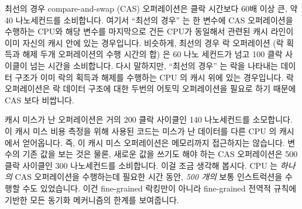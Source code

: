최선의 경우 compare-and-swap (CAS) 오퍼레이션은 클락 시간보다 60배 이상 큰, 약
40 나노세컨드를 소비합니다.
여기서 ``최선의 경우'' 는 한 변수에 CAS 오퍼레이션을 수행하는 CPU와 해당 변수를
마지막으로 건든 CPU가 동일해서 관련된 캐시 라인이 이미 자신의 캐시 안에 있는
경우입니다.
비슷하게, 최선의 경우 락 오퍼레이션 (락 획득과 해제 두개 오퍼레이션의 수행
시간의 합) 은 60 나노 세컨드가 넘고 100 클락 사이클이 넘는  시간을 소비합니다.
다시 말하지만, ``최선의 경우'' 는 락을 나타내는 데이터 구조가 이미 락의 획득과
해제를 수행하는 CPU 의 캐시 위에 있는 경우입니다.
락 오퍼레이션은 락 데이터 구조에 대한 두번의 어토믹 오퍼레이션을 필요로 하기
때문에 CAS 보다 비쌉니다.

캐시 미스가 난 오퍼레이션은 거의 200 클락 사이클인 140 나노세컨드를 소모합니다.
이 캐시 미스 비용 측정을 위해 사용된 코드는 미스가 난 데이터를 다른 CPU 의
캐시에서 얻어옵니다. 즉, 이 캐시 미스 오퍼레이션은 메모리까지 접근하지는
않습니다.
변수의 기존 값을 보는 것은 물론, 새로운 값을 쓰기도 해야 하는 CAS 오퍼레이션은
500 클락 사이클인 300 나노세컨드를 소비합니다.
이걸 조금 생각해 봅시다.
CPU 는 \emph{하나의} CAS 오퍼레이션을 수행하는데 필요한 시간 동안, \emph{500
개의} 보통 인스트럭션을 수행할 수도 있었습니다.
이건 fine-grained 락킹만이 아니라 fine-grained 전역적 규칙에 기반한 모든 동기화
메커니즘의 한계를 보여줍니다.

